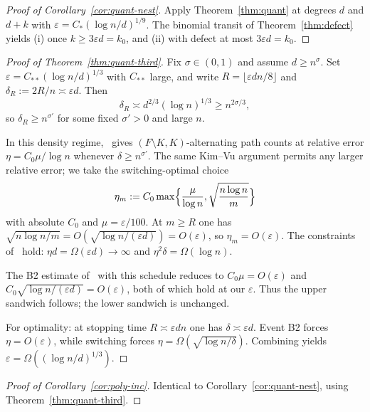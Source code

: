 \documentclass[11pt]{article}
\begin{document}
\begin{proof}[Proof of Corollary~\ref{cor:quant-nest}]
Apply Theorem~\ref{thm:quant} at degrees \(d\) and \(d+k\) with
\(\varepsilon=C_*(\log n/d)^{1/9}\).
The binomial transit of Theorem~\ref{thm:defect} yields (i) once
\(k\ge 3\varepsilon d=k_0\), and (ii) with defect at most \(3\varepsilon d=k_0\).
\end{proof}

\begin{proof}[Proof of Theorem~\ref{thm:quant-third}]
Fix \(\sigma\in(0,1)\) and assume \(d\ge n^{\sigma}\).
Set \(\varepsilon=C_{**}(\log n/d)^{1/3}\) with \(C_{**}\) large, and write
\(R=\lfloor\varepsilon dn/8\rfloor\) and \(\delta_R:=2R/n\asymp\varepsilon d\).
Then
\[
\delta_R\asymp d^{2/3}(\log n)^{1/3}\ge n^{2\sigma/3},
\]
so \(\delta_R\ge n^{\sigma'}\) for some fixed \(\sigma'>0\) and large \(n\).

In this density regime,~\cite[Lemma~8.1]{BIM25} gives
\((F\setminus K,K)\)-alternating path counts at relative error
\(\eta=C_0\mu/\log n\) whenever \(\delta\ge n^{\sigma'}\).
The same Kim--Vu argument permits any larger relative error; we take the
switching-optimal choice
\[
\eta_m:=C_0\max\Bigl\{\frac{\mu}{\log n},\sqrt{\frac{n\log n}{m}}\Bigr\}
\]
with absolute \(C_0\) and \(\mu=\varepsilon/100\).
At \(m\ge R\) one has \(\sqrt{n\log n/m}=O(\sqrt{\log n/(\varepsilon d)})=O(\varepsilon)\),
so \(\eta_m=O(\varepsilon)\).
The constraints of~\cite[Theorem~4.1]{BIM25} hold:
\(\eta d=\Omega(\varepsilon d)\to\infty\) and \(\eta^2\delta=\Omega(\log n)\).

The B2 estimate of~\cite[§3.5.5]{BIM25} with this schedule reduces to
\(C_0\mu=O(\varepsilon)\) and \(C_0\sqrt{\log n/(\varepsilon d)}=O(\varepsilon)\), both of
which hold at our \(\varepsilon\).
Thus the upper sandwich follows; the lower sandwich is unchanged.

For optimality: at stopping time \(R\asymp\varepsilon dn\) one has \(\delta\asymp\varepsilon d\).
Event B2 forces \(\eta=O(\varepsilon)\), while switching forces
\(\eta=\Omega(\sqrt{\log n/\delta})\).
Combining yields \(\varepsilon=\Omega((\log n/d)^{1/3})\).
\end{proof}

\begin{proof}[Proof of Corollary~\ref{cor:poly-inc}]
Identical to Corollary~\ref{cor:quant-nest}, using Theorem~\ref{thm:quant-third}.
\end{proof}
\end{document}
